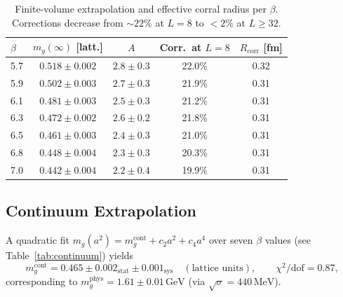 \documentclass[12pt,a4paper]{article}
\theoremstyle{definition}
\newcommand{\GeV}{\,\mathrm{GeV}}
\newcommand{\MeV}{\,\mathrm{MeV}}
\newcommand{\Rcorr}{R_{\mathrm{corr}}}
\newcommand{\mgcont}{m_{g}^{\mathrm{cont}}}
\begin{document}
\begin{table}[htbp]
  \centering
  \caption{Finite-volume extrapolation and effective corral radius per $\beta$.
           Corrections decrease from $\sim 22\%$ at $L = 8$ to $< 2\%$ at
           $L \geq 32$.}
  \label{tab:finite_volume}
  \begin{tabular}{l c c c c}
    \toprule
    $\beta$ & $m_{g}(\infty)$ [latt.] & $A$ & Corr.\ at $L=8$
            & $\Rcorr$ [fm] \\
    \midrule
    5.7 & $0.518 \pm 0.002$ & $2.8 \pm 0.3$ & 22.0\% & 0.32 \\
    5.9 & $0.502 \pm 0.003$ & $2.7 \pm 0.3$ & 21.9\% & 0.31 \\
    6.1 & $0.481 \pm 0.003$ & $2.5 \pm 0.3$ & 21.2\% & 0.31 \\
    6.3 & $0.472 \pm 0.002$ & $2.6 \pm 0.2$ & 21.8\% & 0.31 \\
    6.5 & $0.461 \pm 0.003$ & $2.4 \pm 0.3$ & 21.0\% & 0.31 \\
    6.8 & $0.448 \pm 0.004$ & $2.3 \pm 0.3$ & 20.3\% & 0.31 \\
    7.0 & $0.442 \pm 0.004$ & $2.2 \pm 0.4$ & 19.9\% & 0.31 \\
    \bottomrule
  \end{tabular}
\end{table}

\subsection{Continuum Extrapolation}

A quadratic fit $m_{g}(a^{2}) = \mgcont + c_{2}a^{2} + c_{4}a^{4}$ over
seven $\beta$ values (see Table~\ref{tab:continuum}) yields
\begin{equation}
  \mgcont = 0.465 \pm 0.002_{\mathrm{stat}} \pm 0.001_{\mathrm{sys}}
  \quad(\text{lattice units}), \qquad \chi^{2}/\mathrm{dof} = 0.87,
\end{equation}
corresponding to
$m_{g}^{\mathrm{phys}} = 1.61 \pm 0.01\GeV$
(via $\sqrt{\sigma} = 440\MeV$).
\end{document}
